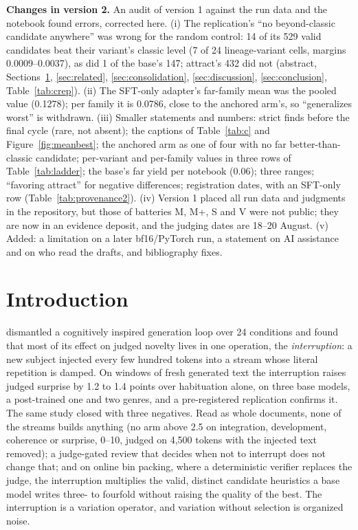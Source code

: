 \documentclass[11pt]{article}
\begin{document}
{\small\noindent\textbf{Changes in version 2.} An audit of version 1
against the run data and the notebook found errors, corrected here.
(i) The replication's ``no beyond-classic candidate anywhere'' was wrong
for the random control: 14 of its 529 valid candidates beat their
variant's classic level (7 of 24 lineage-variant cells, margins
0.0009--0.0037), as did 1 of the base's 147; attract's 432 did not
(abstract, Sections~\ref{sec:intro}, \ref{sec:related},
\ref{sec:consolidation}, \ref{sec:discussion}, \ref{sec:conclusion},
Table~\ref{tab:crep}). (ii) The SFT-only adapter's far-family mean was
the pooled value (0.1278); per family it is 0.0786, close to the anchored
arm's, so ``generalizes worst'' is withdrawn. (iii) Smaller statements
and numbers: strict finds before the final cycle (rare, not absent); the
captions of Table~\ref{tab:c} and Figure~\ref{fig:meanbest}; the
anchored arm as one of four with no far better-than-classic candidate;
per-variant and per-family values in three rows of
Table~\ref{tab:ladder}; the base's
far yield per notebook (0.06); three ranges; ``favoring attract'' for
negative differences; registration dates, with an SFT-only row
(Table~\ref{tab:provenance2}). (iv) Version 1 placed all run data and
judgments in the repository, but those of batteries M, M+, S and V were
not public; they are now in an evidence deposit, and the judging dates
are 18--20 August.
(v) Added: a limitation on a later bf16/PyTorch run, a statement on AI
assistance and on who read the drafts, and bibliography fixes.\par}

\section{Introduction}
\label{sec:intro}

\citet{ono2026interrupting} dismantled a cognitively inspired generation
loop over 24 conditions and found that most of its effect on judged novelty
lives in one operation, the \emph{interruption}: a new subject injected
every few hundred tokens into a stream whose literal repetition is damped.
On windows of fresh generated text the interruption raises judged surprise
by 1.2 to 1.4 points over habituation alone, on three base models, a
post-trained one and two genres, and a pre-registered replication confirms
it. The same study closed with three negatives. Read as whole documents,
none of the streams builds anything (no arm above 2.5 on integration,
development, coherence or surprise, 0--10, judged on 4,500 tokens with the
injected text removed); a judge-gated review that decides when not to
interrupt does not change that; and on online bin packing, where a
deterministic verifier replaces the judge, the interruption multiplies the
valid, distinct candidate heuristics a base model writes three- to fourfold
without raising the quality of the best. The interruption is a variation
operator, and variation without selection is organized noise.
\end{document}
